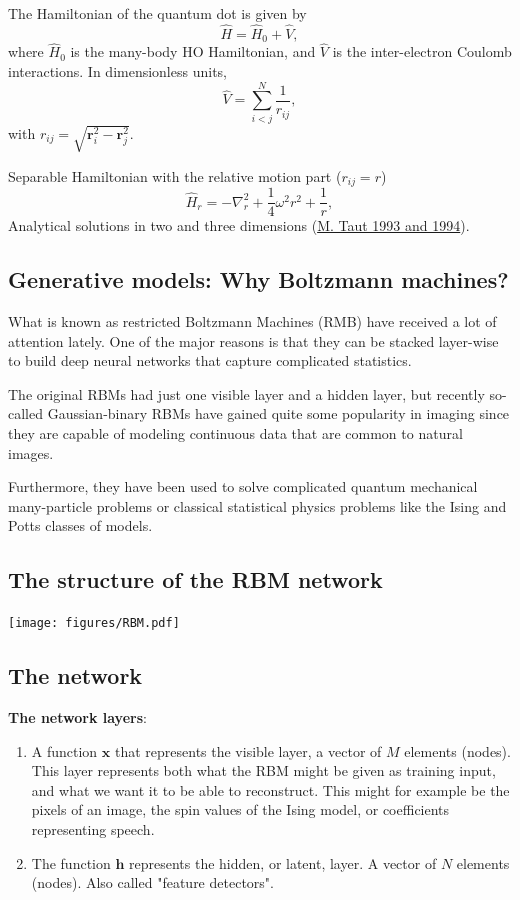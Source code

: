 \documentclass[%
oneside,                 %
final,                   %
10pt]{article}
\begin{document}
The Hamiltonian of the quantum dot is given by
\[ \hat{H} = \hat{H}_0 + \hat{V}, 
\]
where $\hat{H}_0$ is the many-body HO Hamiltonian, and $\hat{V}$ is the
inter-electron Coulomb interactions. In dimensionless units,
\[ \hat{V}= \sum_{i < j}^N \frac{1}{r_{ij}},
\]
with $r_{ij}=\sqrt{\mathbf{r}_i^2 - \mathbf{r}_j^2}$.

Separable Hamiltonian with the relative motion part ($r_{ij}=r$)
\[ 
\hat{H}_r=-\nabla^2_r + \frac{1}{4}\omega^2r^2+ \frac{1}{r},
\]
Analytical solutions in two and three dimensions (\href{{https://journals.aps.org/pra/abstract/10.1103/PhysRevA.48.3561}}{M. Taut 1993 and 1994}). 

\subsection{Generative models: Why Boltzmann machines?}

What is known as restricted Boltzmann Machines (RMB) have received a
lot of attention lately.  One of the major reasons is that they can be
stacked layer-wise to build deep neural networks that capture
complicated statistics.

The original RBMs had just one visible layer and a hidden layer, but
recently so-called Gaussian-binary RBMs have gained quite some
popularity in imaging since they are capable of modeling continuous
data that are common to natural images.

Furthermore, they have been used to solve complicated quantum
mechanical many-particle problems or classical statistical physics
problems like the Ising and Potts classes of models.

\subsection{The structure of the RBM network}

\vspace{6mm}

\centerline{\texttt{[image: figures/RBM.pdf]}}

\vspace{6mm}

\subsection{The network}

\textbf{The network layers}:
\begin{enumerate}
 \item A function $\bm{x}$ that represents the visible layer, a vector of $M$ elements (nodes). This layer represents both what the RBM might be given as training input, and what we want it to be able to reconstruct. This might for example be the pixels of an image, the spin values of the Ising model, or coefficients representing speech.

 \item The function $\bm{h}$ represents the hidden, or latent, layer. A vector of $N$ elements (nodes). Also called "feature detectors".
\end{enumerate}
\end{document}
